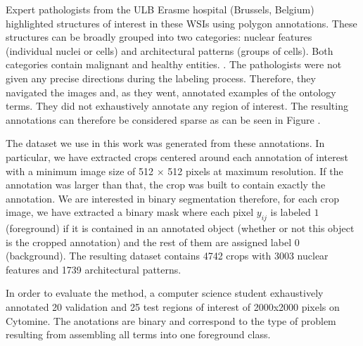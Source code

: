 Expert pathologists from the ULB Erasme hospital (Brussels, Belgium) highlighted structures of interest in these WSIs using polygon annotations. These structures can be broadly grouped into two categories: nuclear features (individual nuclei or cells) and architectural patterns (groups of cells). Both categories contain malignant and healthy entities. . The pathologists were not given any precise directions during the labeling process. Therefore, they navigated the images and, as they went, annotated examples of the ontology terms. They did not exhaustively annotate any region of interest. The resulting annotations can therefore be considered sparse as can be seen in Figure . 


The dataset we use in this work was generated from these annotations. In particular, we have extracted crops centered around each annotation of interest with a minimum image size of 512 $\times$ 512 pixels at maximum resolution. If the annotation was larger than that, the crop was built to contain exactly the annotation. We are interested in binary segmentation therefore, for each crop image, we have extracted a binary mask where each pixel $y_{ij}$ is labeled $1$ (foreground) if it is contained in an annotated object (whether or not this object is the cropped annotation) and the rest of them are assigned label $0$ (background). The resulting dataset contains 4742 crops with 3003 nuclear features and 1739 architectural patterns. 

In order to evaluate the method, a computer science student exhaustively annotated 20 validation and 25 test regions of interest of 2000x2000 pixels on Cytomine. The anotations are binary and correspond to the type of problem resulting from assembling all terms into one foreground class. 


